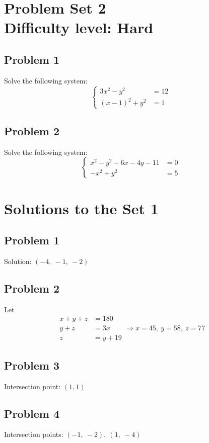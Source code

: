 \documentclass[12pt]{article}
\begin{document}
\section*{Problem Set 2\\Difficulty level: Hard}
\subsection*{Problem 1}
Solve the following system:
\[
\left\{
\begin{aligned}
3x^2 - y^2 &= 12\\[6pt]
(x - 1)^2 + y^2 &= 1
\end{aligned}
\right.
\]

\subsection*{Problem 2}
Solve the following system:
\[
\left\{
\begin{aligned}
x^2 - y^2 - 6x - 4y - 11 &= 0\\[6pt]
- x^2 + y^2 &= 5
\end{aligned}
\right.
\]

\newpage
\section*{Solutions to the Set 1}

\subsection*{Problem 1}
Solution: \(\boxed{(-4,\ -1,\ -2)}\)

\subsection*{Problem 2}
Let
\[
\begin{aligned}
x + y + z &= 180 \\
y + z &= 3x \\
z &= y + 19
\end{aligned}
\Rightarrow \boxed{x = 45,\ y = 58,\ z = 77}
\]

\subsection*{Problem 3}
Intersection point: \(\boxed{(1,1)}\)

\subsection*{Problem 4}
Intersection points: \(\boxed{(-1,\ -2),\ (1,\ -4)}\)
\end{document}
